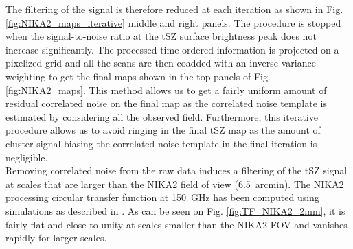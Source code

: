 \documentclass[traditabstract]{aa}
\begin{document}
\indent The filtering of the signal is therefore reduced at each iteration as shown in Fig. \ref{fig:NIKA2_maps_iterative} middle and right panels. The procedure is stopped when the signal-to-noise ratio at the tSZ surface brightness peak does not increase significantly. The processed time-ordered information is projected on a pixelized grid and all the scans are then coadded with an inverse variance weighting to get the final maps shown in the top panels of Fig. \ref{fig:NIKA2_maps}. This method allows us to get a fairly uniform amount of residual correlated noise on the final map as the correlated noise template is estimated by considering all the observed field. Furthermore, this iterative procedure allows us to avoid ringing in the final tSZ map as the amount of cluster signal biasing the correlated noise template in the final iteration is negligible.\\
\indent Removing correlated noise from the raw data induces a filtering of the tSZ signal at scales that are larger than the NIKA2 field of view (6.5~arcmin). The NIKA2 processing circular transfer function at 150~GHz has been computed using simulations as described in \citep{ada15}. As can be seen on Fig. \ref{fig:TF_NIKA2_2mm}, it is fairly flat and close to unity at scales smaller than the NIKA2 FOV and vanishes rapidly for larger scales.\\
\end{document}

